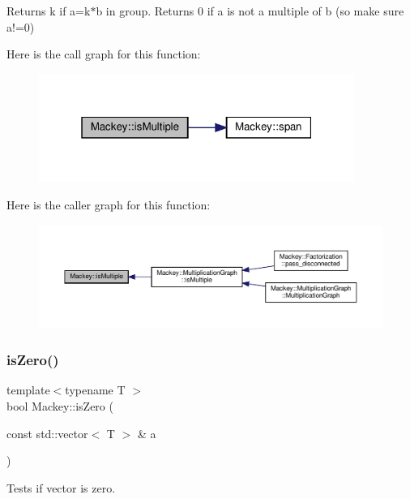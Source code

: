 Returns k if a=k$\ast$b in group. Returns 0 if a is not a multiple of b (so make sure a!=0) 

Here is the call graph for this function\+:\nopagebreak
\begin{figure}[H]
\begin{center}
\leavevmode
\includegraphics[width=292pt]{namespaceMackey_af70b0c547f7121b8815885dfebde67d9_cgraph}
\end{center}
\end{figure}
Here is the caller graph for this function\+:\nopagebreak
\begin{figure}[H]
\begin{center}
\leavevmode
\includegraphics[width=350pt]{namespaceMackey_af70b0c547f7121b8815885dfebde67d9_icgraph}
\end{center}
\end{figure}
\mbox{\label{namespaceMackey_a4c3647777bc890a4649ae24b138bbb79}} 
\subsubsection{\texorpdfstring{is\+Zero()}{isZero()}}
{\footnotesize\ttfamily template$<$typename T $>$ \\
bool Mackey\+::is\+Zero (\begin{DoxyParamCaption}\item[{const std\+::vector$<$ T $>$ \&}]{a }\end{DoxyParamCaption})}



Tests if vector is zero. 

